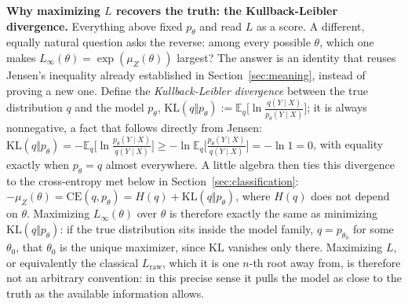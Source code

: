 \documentclass[11pt]{article}
\begin{document}
\textbf{Why maximizing $L$ recovers the truth: the Kullback-Leibler
divergence.} Everything above fixed $p_\theta$ and read $L$ as a
score. A different, equally natural question asks the reverse: among
every possible $\theta$, which one makes $L_\infty(\theta) =
\exp(\mu_Z(\theta))$ largest? The answer is an identity that reuses
Jensen's inequality already established in Section~\ref{sec:meaning},
instead of proving a new one. Define the \emph{Kullback-Leibler
divergence} between the true distribution $q$ and the model
$p_\theta$, $\mathrm{KL}(q\Vert p_\theta) := \mathbb E_q\big[\ln
\frac{q(Y\mid X)}{p_\theta(Y\mid X)}\big]$; it is always nonnegative, a
fact that follows directly from Jensen: $\mathrm{KL}(q\Vert p_\theta) =
-\mathbb E_q\big[\ln \frac{p_\theta(Y\mid X)}{q(Y\mid X)}\big] \ge -\ln
\mathbb E_q\big[\frac{p_\theta(Y\mid X)}{q(Y\mid X)}\big] = -\ln 1 =
0$, with equality exactly when $p_\theta = q$ almost everywhere. A
little algebra then ties this divergence to the cross-entropy met
below in Section~\ref{sec:classification}: $-\mu_Z(\theta) =
\mathrm{CE}(q,p_\theta) = H(q) + \mathrm{KL}(q\Vert p_\theta)$, where
$H(q)$ does not depend on $\theta$. Maximizing $L_\infty(\theta)$ over
$\theta$ is therefore exactly the same as minimizing $\mathrm{KL}(q
\Vert p_\theta)$: if the true distribution sits inside the model
family, $q = p_{\theta_0}$ for some $\theta_0$, that $\theta_0$ is the
unique maximizer, since $\mathrm{KL}$ vanishes only there. Maximizing
$L$, or equivalently the classical $L_{\text{raw}}$, which it is one
$n$-th root away from, is therefore not an arbitrary convention: in this
precise sense it pulls the model as close to the truth as the
available information allows.
\end{document}
